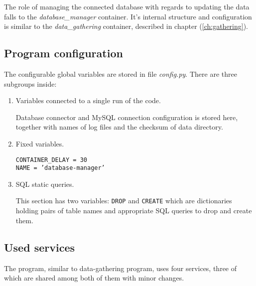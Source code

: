 The role of managing the connected database with regards to updating the data falls to the \textit{database\_manager} container. It's internal structure and configuration is similar to the \textit{data\_gathering} container, described in chapter (\ref{ch:gathering}).

\subsection{Program configuration}
The configurable global variables are stored in file \textit{config.py}. There are three subgroups inside:

\begin{enumerate}
    \item Variables connected to a single run of the code. \par
          Database connector and MySQL connection configuration is stored here, together with names of log files and the checksum of data directory.
    \item Fixed variables. \par
          \texttt{CONTAINER\_DELAY = 30 \\ NAME = 'database-manager'}
    \item SQL static queries. \par
          This section has two variables: \texttt{DROP} and \texttt{CREATE} which are dictionaries holding pairs of table names and appropriate SQL queries to drop and create them.
\end{enumerate}


\subsection{Used services}
The program, similar to data-gathering program, uses four services, three of which are shared among both of them with minor changes.

